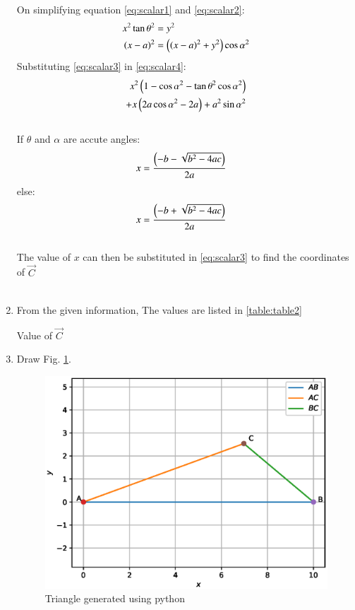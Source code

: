 \begin{enumerate}[label=\thesection.\arabic*.,ref=\thesection.\theenumi]
On simplifying equation \ref{eq:scalar1} and \ref{eq:scalar2}:
\begin{align}
x^2 \tan{\theta}^2 &= y^2 \label{eq:scalar3}\\
\left(x - a\right)^2 &= \left(\left(x-a\right)^2 + y^2\right)\cos{\alpha}^2\label{eq:scalar4}
\end{align}
Substituting \ref{eq:scalar3} in \ref{eq:scalar4}:
\begin{align}
\begin{split}\label{eq:scalar5}
x^2\left(1-\cos{\alpha}^2-\tan{\theta}^2\cos{\alpha}^2\right)\\
+ x\left(2a\cos{\alpha}^2-2a\right) + a^2\sin{\alpha}^2
\end{split}
\end{align}\\

If $\theta$ and $\alpha$ are accute angles:
\begin{align}
x &= \frac{\left(-b-\sqrt{b^2-4ac}\right)}{2a}
\end{align}
else:
\begin{align}
x &= \frac{\left(-b+\sqrt{b^2-4ac}\right)}{2a}
\end{align}\\

The value of $x$ can then be substituted in \ref{eq:scalar3} to find the coordinates of $\vec{C}$\\ \\

\item
From the given information, 
The values are listed in \ref{table:table2}\\
\begin{table}[ht!]
\centering

\caption{Value of $\vec{C}$}
\label{table:table2}	
\end{table} 

\item Draw Fig. \ref{fig:triangle2}.

\begin{figure}[!ht]
\centering
\includegraphics[width=\columnwidth]{./figs/triangle_linearalg.eps}
\caption{Triangle generated using python}
\label{fig:triangle2}
\end{figure} 


\end{enumerate}
